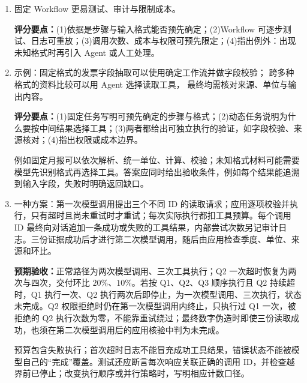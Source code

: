\begin{enumerate}[label={},leftmargin=4.8em,itemsep=4pt]
\item[\textbf{\hyperref[exercise:fixed-workflow-audit]{C-107.}}] \leavevmode{}\label{solution:C-107}\label{solution:fixed-workflow-audit}固定 Workflow 更易测试、审计与限制成本。\par\textbf{评分要点：}(1)依据是步骤与输入格式能否预先确定；(2)Workflow 可逐步测试、日志可重放；(3)调用次数、成本与权限可预先限定；(4)指出例外：出现未知格式时再引入 Agent 或人工处理。
\item[\textbf{\hyperref[exercise:workflow-agent-choice]{C-108.}}] \leavevmode{}\label{solution:C-108}\label{solution:workflow-agent-choice}示例：固定格式的发票字段抽取可以使用确定工作流并做字段校验；
跨多种格式的资料比较可以用 Agent 选择读取工具，
最终均需核对来源、单位与输出内容。\par\textbf{评分要点：}(1)固定任务写明可预先确定的步骤与格式；(2)动态任务说明为什么要按中间结果选择工具；(3)两者都给出可独立执行的验证，如字段校验、来源核对；(4)指出权限或成本边界。\par 例如固定月报可以依次解析、统一单位、计算、校验；未知格式材料可能需要模型先识别格式再选择工具。答案应同时给出验收条件，例如每个结果能追溯到输入字段，失败时明确返回缺口。
\item[\textbf{\hyperref[exercise:agent-bounded-retry-design]{C-109.}}] \leavevmode{}\label{solution:C-109}\label{solution:agent-bounded-retry-design}一种方案：第一次模型调用提出三个不同 ID 的读取请求；应用逐项校验并执行，只有超时且尚未重试时才重试；每次实际执行都扣工具预算。每个调用 ID 最终向对话追加一条成功或失败的工具结果，内部尝试次数另记审计日志。三份证据成功后才进行第二次模型调用，随后由应用检查季度、单位、来源和环比。\par\textbf{预期验收：}正常路径为两次模型调用、三次工具执行；Q2 一次超时恢复为两次与四次，交付环比 $20\%$、$10\%$。若按 Q1、Q2、Q3 顺序执行且 Q2 持续超时，Q1 执行一次、Q2 执行两次后即停止，为一次模型调用、三次执行，状态未完成。Q2 权限拒绝时仍在第一次模型调用内终止，只执行过 Q1 一次，被拒绝的 Q2 执行次数为零，不能靠重试绕过；最终数字伪造时即使三份读取成功，也须在第二次模型调用后的应用核验中判为未完成。\par 预算包含失败执行；首次超时日志不能冒充成功工具结果，错误状态不能被模型自己的“完成”覆盖。测试还应断言每次响应关联正确的调用 ID，并检查越界前已停止；改变执行顺序或并行策略时，写明相应计数口径。
\end{enumerate}
